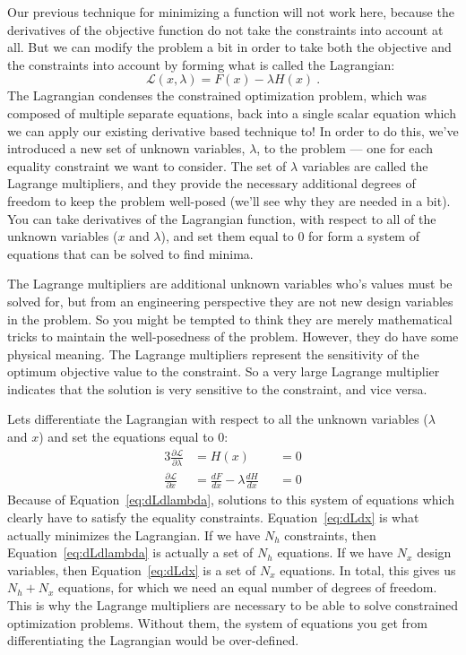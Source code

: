\documentclass[conf]{new-aiaa}
\begin{document}
        Our previous technique for minimizing a function will not work here, because the derivatives of the objective function do not take the constraints into account at all. 
        But we can modify the problem a bit in order to take both the objective and the constraints into account by forming what is called the Lagrangian:  
        \begin{equation}
            \mathcal{L}(x, \lambda) = F(x) - \lambda H(x) \ .
        \end{equation}
        The Lagrangian condenses the constrained optimization problem, which was composed of multiple separate equations, back into a single scalar equation which we can apply our existing derivative based technique to! 
        In order to do this, we've introduced a new set of unknown variables, $\lambda$, to the problem --- one for each equality constraint we want to consider. 
        The set of $\lambda$ variables are called the Lagrange multipliers, and they provide the necessary additional degrees of freedom to keep the problem well-posed (we'll see why they are needed in a bit). 
        You can take derivatives of the Lagrangian function, with respect to all of the unknown variables ($x$ and $\lambda$), and set them equal to 0 for form a system of equations that can be solved to find minima. 


        The Lagrange multipliers are additional unknown variables who's values must be solved for, but from an engineering perspective they are not new design variables in the problem. 
        So you might be tempted to think they are merely mathematical tricks to maintain the well-posedness of the problem. 
        However, they do have some physical meaning. 
        The Lagrange multipliers represent the sensitivity of the optimum objective value to the constraint. 
        So a very large Lagrange multiplier indicates that the solution is very sensitive to the constraint, and vice versa. 


        Lets differentiate the Lagrangian with respect to all the unknown variables ($\lambda$ and $x$) and set the equations equal to 0: 
        \begin{alignat}{3}
            \frac{\partial \mathcal{L}}{\partial \lambda} &= H(x) &&= 0 \label{eq:dLdlambda} \\
            \frac{\partial \mathcal{L}}{\partial x} &= \frac{dF}{dx} - \lambda \frac{dH}{dx} &&= 0 \label{eq:dLdx}
        \end{alignat}
        Because of Equation~\eqref{eq:dLdlambda}, solutions to this system of equations which clearly have to satisfy the equality constraints. 
        Equation~\eqref{eq:dLdx} is what actually minimizes the Lagrangian.
        If we have $N_h$ constraints, then  Equation~\eqref{eq:dLdlambda} is actually a set of $N_h$ equations. 
        If we have $N_x$ design variables, then Equation~\eqref{eq:dLdx} is a set of $N_x$ equations. 
        In total, this gives us $N_h + N_x$ equations, for which we need an equal number of degrees of freedom. 
        This is why the Lagrange multipliers are necessary to be able to solve constrained optimization problems. 
        Without them, the system of equations you get from differentiating the Lagrangian would be over-defined. 
\end{document}
